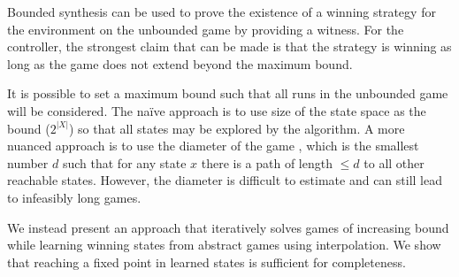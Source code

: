 \documentclass{llncs}
\begin{document}
\label{sect:unbounded}

Bounded synthesis can be used to prove the existence of a winning strategy for
the environment on the unbounded game by providing a witness. For the
controller, the strongest claim that can be made is that the strategy is
winning as long as the game does not extend beyond the maximum bound.

It is possible to set a maximum bound such that all runs in the unbounded game will be
considered. The na\"ive approach is to use size of the state space as the bound
($2^{|X|}$) so that all states may be explored by the algorithm. A more nuanced
approach is to use the diameter of the game \cite{biere1999}, which is the
smallest number $d$ such that for any state $x$ there is a path of length $\leq
d$ to all other reachable states. However, the diameter is difficult to
estimate and can still lead to infeasibly long games.

We instead present an approach that iteratively solves games of increasing
bound while learning winning states from abstract games using 
interpolation. We show
that reaching a fixed point in learned states is sufficient for completeness.






\end{document}
